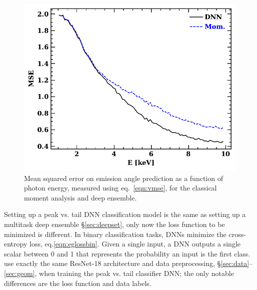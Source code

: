 \begin{figure}[t]
\centering
\includegraphics[scale=.75]{figures/mse.pdf}
\caption{Mean squared error on emission angle prediction as a function of photon energy, measured using eq.~\ref{eqn:vmse}, for the classical moment analysis and deep ensemble.}
\label{fig:mse}      
\end{figure}

Setting up a peak vs. tail DNN classification model is the same as setting up a multitask deep ensemble \S\ref{sec:deepset}, only now the loss function to be minimized is different. In binary classification tasks, DNNs minimize the cross-entropy loss, eq.\ref{eqn:eglossbin}.
Given a single input, a DNN outputs a single scalar between 0 and 1 that represents the probability an input is the first class. \citet{peirson_towards_2021} use exactly the same ResNet-18 architecture and data preprocessing, \S\ref{sec:data}--\ref{sec:geom}, when training the peak vs. tail classifier DNN; the only notable differences are the loss function and data labels.


